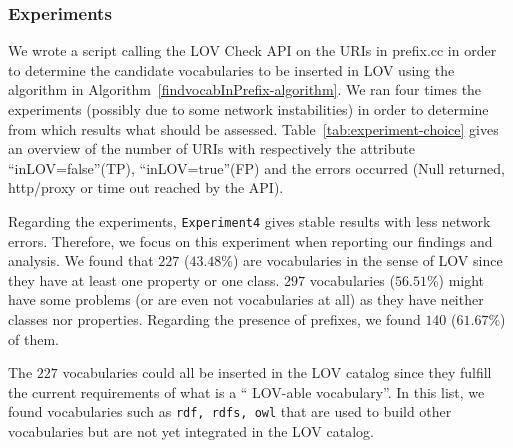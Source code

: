 \subsubsection{Experiments} \label{experiments}
We wrote a script calling the LOV Check API on the URIs in prefix.cc in order to determine the candidate vocabularies to be inserted in LOV using the algorithm in Algorithm~\ref{findvocabInPrefix-algorithm}. We ran four times the experiments (possibly due to some network instabilities) in order to determine from which results what should be assessed. Table~\ref{tab:experiment-choice} gives an overview of the number of URIs with respectively the attribute ``inLOV=false''(TP), ``inLOV=true''(FP) and the errors occurred (Null returned, http/proxy or time out reached by the API).

Regarding the experiments, \texttt{Experiment4} gives stable results with less network errors. Therefore, we focus on this experiment when reporting our findings and analysis. We found that $227$ ($43.48$\%) are vocabularies in the sense of LOV since they have at least one property or one class. $297$ vocabularies ($56.51$\%) might have some problems (or are even not vocabularies at all) as they have neither classes nor properties. Regarding the presence of prefixes, we found $140$ ($61.67$\%) of them.
\begin{table}[!htbp]
\end{table}
The $227$ vocabularies could all be inserted in the LOV catalog since they fulfill the current requirements of what is a `` LOV-able vocabulary''. In this list, we found vocabularies such as \texttt{rdf, rdfs, owl} that are used to build other vocabularies but are not yet integrated in the LOV catalog.

